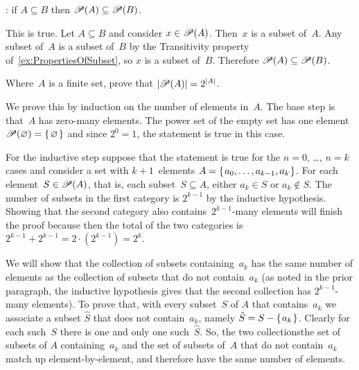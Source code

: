 \documentclass{test}  %
\begin{document}
\begin{problem}
\end{problem}

\begin{problem} \pord:
if $A\subseteq B$ then $\mathscr{P}(A)\subseteq\mathscr{P}(B)$.  
\begin{answer}
This is true.
Let $A\subseteq B$ and consider $x\in\mathscr{P}(A)$.
Then~$x$ is a subset of~$A$.
Any subset of~$A$ is a subset of~$B$ by 
the Transitivity property of~\ref{ex:PropertiesOfSubset},
so $x$ is a subset of~$B$.
Therefore $\mathscr{P}(A)\subseteq\mathscr{P}(B)$.
\end{answer}
\end{problem}

\begin{problem}
Where~$A$ is a finite set, prove that $|\mathscr{P}(A)|=2^{|A|}$.    
\begin{answer}
We prove this by induction on the number of elements in~$A$.
The base step is that~$A$ has zero-many elements.
The power set of the empty set has
one element $\mathscr{P}(\varnothing)=\mbox{$\{\hspace{0.1em}\varnothing\hspace{0.1em}\}$}$ and
since $2^0=1$, the statement is true in this case. 

For the inductive step suppose that the statement is true for the 
$n=0$, \ldots, $n=k$ cases and consider a set
with $k+1$~elements
$A=\mbox{$\{\hspace{0.1em}a_0, \ldots, a_{k-1},a_k\hspace{0.1em}\}$}$.
For each element~$S\in\mathscr{P}(A)$, that is, each subset~$S\subseteq A$,
either $a_k\in S$ or $a_k\notin S$.
The number of subsets in the first category is $2^{k-1}$ by the inductive
hypothesis.
Showing that 
the second category also contains~$2^{k-1}$-many elements will finish the proof
because then
the total of the two categories is 
$2^{k-1}+2^{k-1}=2\cdot(2^{k-1})=2^k$.

We will show that the collection of subsets containing~$a_k$
has the same number of elements as the collection of subsets that do not
contain~$a_k$
(as noted in the prior paragraph, the inductive hypothesis gives that
the second collection has $2^{k-1}$-many elements).
To prove that, with every subset~$S$ of $A$ that contains~$a_k$ we associate
a subset $\hat{S}$ that does not contain~$a_k$,
namely $\hat{S}=S-\mbox{$\{\hspace{0.1em}a_k\hspace{0.1em}\}$}$.
Clearly for each such~$S$ there is one and only one such~$\hat{S}$.
So, the two collections\Dash the set of subsets of $A$ containing~$a_k$
and the set of subsets of~$A$ that do not contain~$a_k$\Dash match
up element-by-element, and therefore have the same number of elements.
\end{answer}
\end{problem}
\end{document}
